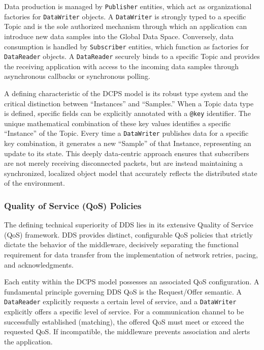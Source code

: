 Data production is managed by \texttt{Publisher} entities, which act as organizational factories for \texttt{DataWriter} objects. A \texttt{DataWriter} is strongly typed to a specific Topic and is the sole authorized mechanism through which an application can introduce new data samples into the Global Data Space. Conversely, data consumption is handled by \texttt{Subscriber} entities, which function as factories for \texttt{DataReader} objects. A \texttt{DataReader} securely binds to a specific Topic and provides the receiving application with access to the incoming data samples through asynchronous callbacks or synchronous polling.

A defining characteristic of the DCPS model is its robust type system and the critical distinction between ``Instances'' and ``Samples.'' When a Topic data type is defined, specific fields can be explicitly annotated with a \texttt{@key} identifier. The unique mathematical combination of these key values identifies a specific ``Instance'' of the Topic. Every time a \texttt{DataWriter} publishes data for a specific key combination, it generates a new ``Sample'' of that Instance, representing an update to its state. This deeply data-centric approach ensures that subscribers are not merely receiving disconnected packets, but are instead maintaining a synchronized, localized object model that accurately reflects the distributed state of the environment.

\subsubsection{Quality of Service (QoS) Policies}

The defining technical superiority of DDS lies in its extensive Quality of Service (QoS) framework. DDS provides distinct, configurable QoS policies that strictly dictate the behavior of the middleware, decisively separating the functional requirement for data transfer from the implementation of network retries, pacing, and acknowledgments.

Each entity within the DCPS model possesses an associated QoS configuration. A fundamental principle governing DDS QoS is the Request/Offer semantic. A \texttt{DataReader} explicitly requests a certain level of service, and a \texttt{DataWriter} explicitly offers a specific level of service. For a communication channel to be successfully established (matching), the offered QoS must meet or exceed the requested QoS. If incompatible, the middleware prevents association and alerts the application.

